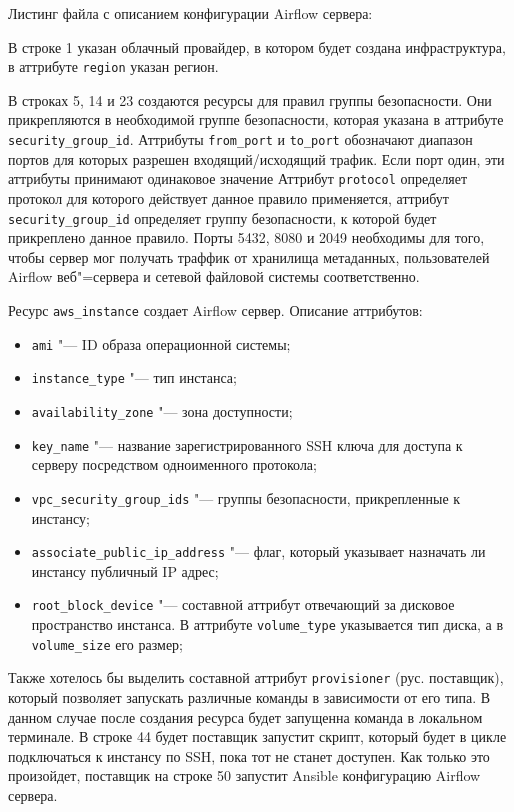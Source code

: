 \documentclass[bachelor, och, pract]{SCWorks}
\begin{document}
Листинг файла с описанием конфигурации Airflow сервера:


В строке 1 указан облачный провайдер, в котором будет создана инфраструктура,  в аттрибуте \verb|region| указан регион.

В строках 5, 14 и 23 создаются ресурсы для правил группы безопасности. Они прикрепляются в необходимой группе безопасности, которая указана в аттрибуте \verb|security_group_id|.  Аттрибуты \verb|from_port| и \verb|to_port| обозначают диапазон портов для которых разрешен входящий/исходящий трафик. Если порт один, эти аттрибуты принимают одинаковое значение Аттрибут \verb|protocol| определяет протокол для которого действует данное правило применяется, аттрибут \verb|security_group_id| определяет группу безопасности, к которой будет прикреплено данное правило. Порты 5432, 8080 и 2049 необходимы для того, чтобы сервер мог получать траффик от хранилища метаданных, пользователей Airflow веб"=сервера и сетевой файловой системы соответственно. 

Ресурс \verb|aws_instance| создает Airflow сервер.
Описание аттрибутов:
\begin{itemize}
	\item \verb|ami| "--- ID образа операционной системы;
	\item \verb|instance_type| "--- тип инстанса;
	\item \verb|availability_zone| "--- зона доступности;
	\item \verb|key_name| "--- название зарегистрированного SSH ключа для доступа к серверу посредством одноименного протокола;
	\item \verb|vpc_security_group_ids| "--- группы безопасности, прикрепленные к инстансу;
	\item \verb|associate_public_ip_address| "--- флаг, который указывает назначать ли инстансу публичный IP адрес;
	\item \verb|root_block_device| "--- составной аттрибут отвечающий за дисковое пространство инстанса. В аттрибуте \verb|volume_type| указывается тип диска, а в \verb|volume_size| его размер;
\end{itemize}

Также хотелось бы выделить составной аттрибут \verb|provisioner| (рус. поставщик), который позволяет запускать различные команды в зависимости от его типа. В данном случае после создания ресурса будет запущенна команда в локальном терминале. В строке 44 будет поставщик запустит скрипт, который будет в цикле подключаться к инстансу по SSH, пока тот не станет доступен. Как только это произойдет, поставщик на строке 50 запустит Ansible конфигурацию Airflow сервера.
\end{document}
